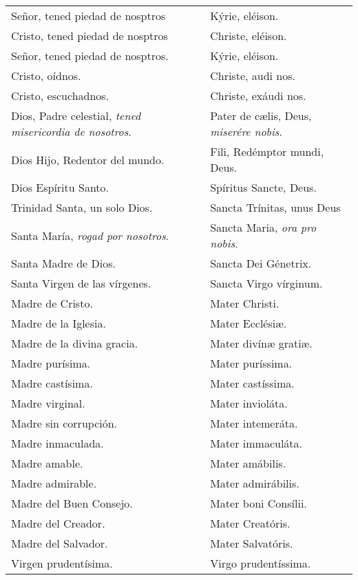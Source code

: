 \documentclass[./devocionario.tex]{subfiles}
\begin{document}
    \begin{longtable} { p{} p{} }
        Señor, tened piedad de nosptros & Kýrie, eléison.\\
        Cristo, tened piedad de nosptros & Christe, eléison.\\
        Señor, tened piedad de nosptros. & Kýrie, eléison.\\
        Cristo, oídnos. & Christe, audi nos.\\
        Cristo, escuchadnos. & Christe, exáudi nos.\\
        Dios, Padre celestial, \emph{tened misericordia de nosotros}. & Pater de cælis, Deus, \emph{miserére nobis}.\\
        Dios Hijo, Redentor del mundo. & Fili, Redémptor mundi, Deus.\\
        Dios Espíritu Santo. & Spíritus Sancte, Deus.\\
        Trinidad Santa, un solo Dios. & Sancta Trínitas, unus Deus\\
        Santa María, \emph{rogad por nosotros}. & Sancta Maria, \emph{ora pro nobis}.\\
        Santa Madre de Dios. & Sancta Dei Génetrix.\\
        Santa Virgen de las vírgenes. & Sancta Virgo vírginum.\\
        Madre de Cristo. & Mater Christi.\\
        Madre de la Iglesia. & Mater Ecclésiæ.\\
        Madre de la divina gracia. & Mater divínæ gratiæ.\\
        Madre purísima. & Mater puríssima.\\
        Madre castísima. & Mater castíssima.\\
        Madre virginal. & Mater invioláta.\\
        Madre sin corrupción. & Mater intemeráta.\\
        Madre inmaculada. & Mater immaculáta.\\
        Madre amable. & Mater amábilis.\\
        Madre admirable. & Mater admirábilis.\\
        Madre del Buen Consejo. & Mater boni Consílii.\\
        Madre del Creador. & Mater Creatóris.\\
        Madre del Salvador. & Mater Salvatóris.\\
        Virgen pru­den­tísima. & Virgo pru­den­tíssima.\\

\end{longtable}
\end{document}

